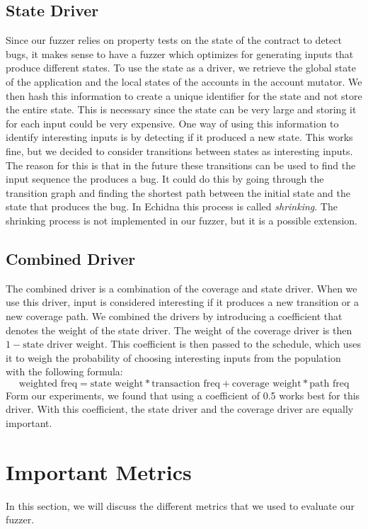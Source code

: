 \subsection*{State Driver}
Since our fuzzer relies on property tests on the state of the contract to detect bugs, it makes sense to have a fuzzer which optimizes for generating inputs that produce different states.
To use the state as a driver, we retrieve the global state of the application and the local states of the accounts in the account mutator.
We then hash this information to create a unique identifier for the state and not store the entire state.
This is necessary since the state can be very large and storing it for each input could be very expensive.
One way of using this information to identify interesting inputs is by detecting if it produced a new state.
This works fine, but we decided to consider transitions between states as interesting inputs.
The reason for this is that in the future these transitions can be used to find the input sequence the produces a bug.
It could do this by going through the transition graph and finding the shortest path between the initial state and the state that produces the bug.
In Echidna this process is called \textit{shrinking}.
The shrinking process is not implemented in our fuzzer, but it is a possible extension.

\subsection*{Combined Driver}
The combined driver is a combination of the coverage and state driver.
When we use this driver, input is considered interesting if it produces a new transition or a new coverage path.
We combined the drivers by introducing a coefficient that denotes the weight of the state driver.
The weight of the coverage driver is then $1 - \text{state driver weight}$.
This coefficient is then passed to the schedule, which uses it to weigh the probability of choosing interesting inputs from the population with the following formula:
\[\text{weighted freq} = \text{state weight} * \text{transaction freq} + \text{coverage weight} * \text{path freq}\]
Form our experiments, we found that using a coefficient of 0.5 works best for this driver.
With this coefficient, the state driver and the coverage driver are equally important.

\section{Important Metrics}
In this section, we will discuss the different metrics that we used to evaluate our fuzzer.

